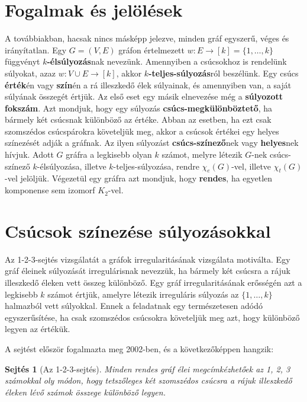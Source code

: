 \documentclass[12pt, a4paper]{report}
\newtheorem{sej}[tét]{Sejtés}
\theoremstyle{remark}
\theoremstyle{definition}
\begin{document}
\section{Fogalmak és jelölések}
A továbbiakban, hacsak nincs másképp jelezve, minden gráf egyszerű, véges és irányítatlan. Egy $G = (V, E)$ gráfon értelmezett $w: E \rightarrow [k] = \lbrace 1, \ldots, k \rbrace$ függvényt \textbf{$k$-élsúlyozás}nak nevezünk. Amennyiben a csúcsokhoz is rendelünk súlyokat, azaz $w: V \cup E \rightarrow [k]$, akkor \textbf{$k$-teljes-súlyozás}ról beszélünk. Egy csúcs \textbf{érték}én vagy \textbf{szín}én a rá illeszkedő élek súlyainak, és amennyiben van, a saját súlyának összegét értjük. Az első eset egy másik elnevezése még a \textbf{súlyozott fokszám}. Azt mondjuk, hogy egy súlyozás \textbf{csúcs-megkülönböztető}, ha bármely két csúcsnak különböző az értéke. Abban az esetben, ha ezt csak szomszédos csúcspárokra követeljük meg, akkor a csúcsok értékei egy helyes színezését adják a gráfnak. Az ilyen súlyozást \textbf{csúcs-színező}nek vagy \textbf{helyes}nek hívjuk. Adott $G$ gráfra a legkisebb olyan $k$ számot, melyre létezik $G$-nek csúcs-színező $k$-élsúlyozása, illetve $k$-teljes-súlyozása, rendre $\chi_e(G)$-vel, illetve $\chi_t(G)$-vel jelöljük. Végezetül egy gráfra azt mondjuk, hogy \textbf{rendes}, ha egyetlen komponense sem izomorf $K_2$-vel.

\section{Csúcsok színezése súlyozásokkal}
Az 1-2-3-sejtés vizsgálatát a gráfok irregularitásának vizsgálata motiválta. Egy gráf éleinek súlyozását irregulárisnak nevezzük, ha bármely két csúcsra a rájuk illeszkedő éleken vett összeg különböző. Egy gráf irregularitásának erősségén azt a legkisebb $k$ számot értjük, amelyre létezik irreguláris súlyozás az $\lbrace 1, \ldots, k \rbrace$ halmazból vett súlyokkal. Ennek a feladatnak egy természetesen adódó egyszerűsítése, ha csak szomszédos csúcsokra követeljük meg azt, hogy különböző legyen az értékük. 

A sejtést először \citeauthor{Karonski2004} \cite{Karonski2004} fogalmazta meg 2002-ben, és a következőképpen hangzik: 

\begin{sej}[Az 1-2-3-sejtés]
Minden rendes gráf élei megcímkézhetőek az 1, 2, 3 számokkal oly módon, hogy tetszőleges két szomszédos csúcsra a rájuk illeszkedő éleken lévő számok összege különböző legyen.
\end{sej}
\end{document}
